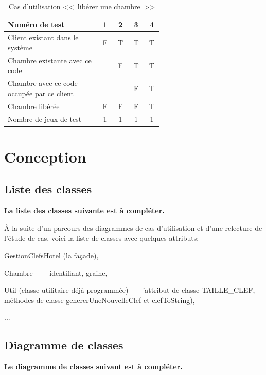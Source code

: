 \documentclass[11pt,article]{article}
\begin{document}
\begin{table}[htbp!]
\begin{tabular}{|p{0.6\linewidth}|c|c|c|c|}
\hline
Numéro de test
&1&2&3&4\\
\hline
\hline
Client existant dans le système
&F&T&T&T\\
\hline
Chambre existante avec ce code
& &F&T&T\\
\hline
Chambre avec ce code occupée par ce client
& & &F&T\\
\hline
\hline
Chambre libérée
&F&F&F&T\\
\hline
\hline
Nombre de jeux de test
&1&1&1&1\\
\hline
\end{tabular}
\caption{Cas d'utilisation <<~libérer une chambre~>>}
\end{table}
\newpage

\section{Conception}

\subsection{Liste des classes}

{\color{red}\textbf{La liste des classes suivante est à compléter.}}

À la suite d'un parcours des diagrammes de cas d'utilisation et d'une
relecture de l'étude de cas, voici la liste de classes avec quelques
attributs:
\begin{compactitem}
\item \textsf{GestionClefsHotel} (la façade),
\item \textsf{Chambre}~---~ identifiant, graine,
\item \textsf{Util} (classe utilitaire déjà programmée)~---~'attribut
  de classe \textsf{TAILLE\_CLEF}, méthodes de classe
  \textsf{genererUneNouvelleClef} et \textsf{clefToString}),
\item ...
\end{compactitem}
\newpage

\subsection{Diagramme de classes}

{\color{red}\textbf{Le diagramme de classes suivant est à compléter.}}
\end{document}
